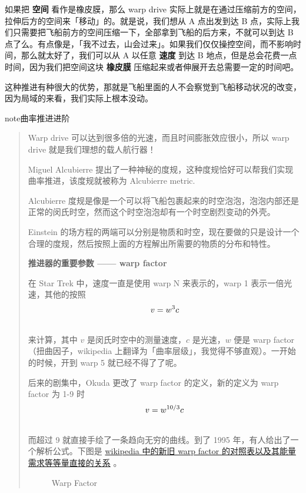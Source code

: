\documentclass[letterpaper,10pt,english]{sphinxmanual}
\begin{document}
如果把 \textbf{空间} 看作是橡皮膜，那么 warp drive 实际上就是在通过压缩前方的空间，拉伸后方的空间来「移动」的。就是说，我们想从 A 点出发到达 B 点，实际上我们只需要把飞船前方的空间压缩一下，全部拿到飞船的后方来，不就可以到达 B 点了么。有点像是，「我不过去，山会过来」。如果我们仅仅操控空间，而不影响时间，那么就太好了，我们可以从 A 以任意 \textbf{速度} 到达 B 地点，但是总会花费一点时间，因为我们把空间这块 \textbf{橡皮膜} 压缩起来或者伸展开去总需要一定的时间吧。

这种推进有种很大的优势，那就是飞船里面的人不会察觉到飞船移动状况的改变，因为局域的来看，我们实际上根本没动。

\begin{notice}{note}{曲率推进进阶}
\begin{quote}

Warp drive 可以达到很多倍的光速，而且时间膨胀效应很小，所以 warp drive 就是我们理想的载人航行器！

Miguel Alcubierre 提出了一种神秘的度规，这种度规恰好可以帮我们实现曲率推进，该度规就被称为 Alcubierre metric.

Alcubierre 度规是像是一个可以将飞船包裹起来的时空泡泡，泡泡内部还是正常的闵氏时空，然而这个时空泡泡却有一个时空剧烈变动的外壳。

Einstein 的场方程的两端可以分别是物质和时空，现在要做的只是设计一个合理的度规，然后按照上面的方程解出所需要的物质的分布和特性。

\textbf{推进器的重要参数 —— warp factor}

在 Star Trek 中，速度一直是使用 warp N 来表示的，warp 1 表示一倍光速，其他的按照
\begin{gather}
\begin{split}v=w^3c\end{split}\notag\\\begin{split}\end{split}\notag
\end{gather}
来计算，其中 $v$ 是闵氏时空中的测量速度，$c$ 是光速，$w$ 便是 warp factor（扭曲因子，wikipedia 上翻译为「曲率层级」，我觉得不够直观）。一开始的时候，开到 warp 5 就已经不得了了呢。

后来的剧集中，Okuda 更改了 warp factor 的定义，新的定义为 warp factor 为 1-9 时
\begin{gather}
\begin{split}v=w^{10/3}c\end{split}\notag\\\begin{split}\end{split}\notag
\end{gather}
而超过 9 就直接手绘了一条趋向无穷的曲线。到了 1995 年，有人给出了一个解析公式。下图是 \href{http://en.wikipedia.org/wiki/File:Warptable.gif}{wikipedia 中的新旧 warp factor 的对照表以及其能量需求等等量直接的关系} 。
\begin{figure}[htbp]
\centering
\capstart
\caption{Warp Factor}\end{figure}


\end{quote}
\end{notice}
\end{document}
